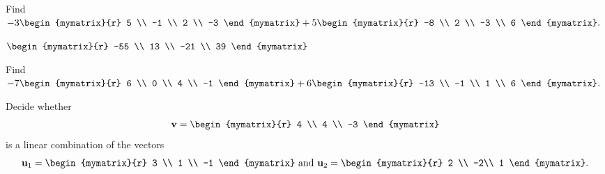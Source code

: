 \begin{enumialphparenastyle}

\begin{ex} Find $-3\begin{mymatrix}{r}
5 \\
-1 \\
2 \\
-3
\end{mymatrix} +5\begin{mymatrix}{r}
-8 \\
2 \\
-3 \\
6
\end{mymatrix} .$ 
\begin{sol}
$\begin{mymatrix}{r}
-55 \\
13 \\
-21 \\
39
\end{mymatrix}$
\end{sol}
\end{ex}

\begin{ex} Find $-7\begin{mymatrix}{r}
6 \\
0 \\
4 \\
-1
\end{mymatrix} +6\begin{mymatrix}{r}
-13 \\
-1 \\
1 \\
6
\end{mymatrix} .$ 
\end{ex}


\begin{ex}
Decide whether 
\begin{equation*}
\vect{v}= \begin{mymatrix}{r}
4 \\
4 \\
-3
\end{mymatrix}
\end{equation*}
is a linear combination of the vectors 
\begin{equation*}
\vect{u}_1 = \begin{mymatrix}{r}
3 \\
1 \\
-1
\end{mymatrix}
\mbox{ and } 
\vect{u}_2 = 
\begin{mymatrix}{r}
2 \\
-2\\
1
\end{mymatrix}.
\end{equation*}


\end{ex}
\end{enumialphparenastyle}
